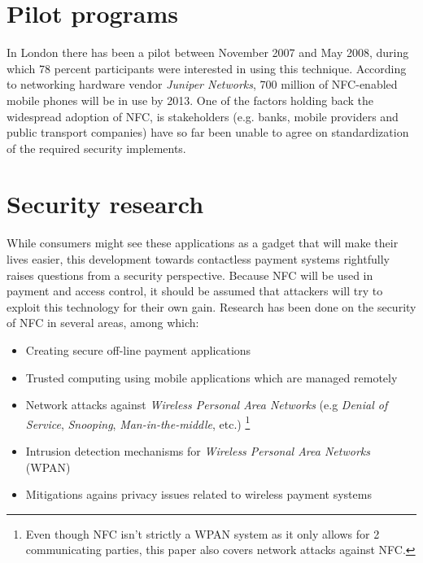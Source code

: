 \section{Pilot programs}
In London there has been a pilot between November 2007 and May 2008, during which 78 percent participants were interested in using this technique.
According to networking hardware vendor \textit{Juniper Networks}, 700 million of NFC-enabled mobile phones will be in use by 2013. 
One of the factors holding back the widespread adoption of NFC, is stakeholders (e.g. banks, mobile providers and public transport companies) have so far been unable to agree on standardization of the required security implements. 

\section{Security research}
While consumers might see these applications as a gadget that will make their lives easier, this development towards contactless payment systems rightfully raises questions from a security perspective.
Because NFC will be used in payment and access control, it should be assumed that attackers will try to exploit this technology for their own gain. 
Research has been done on the security of NFC in several areas, among which:

\begin{itemize}
\item Creating secure off-line payment applications
\item Trusted computing using mobile applications which are managed remotely
\item Network attacks against \textit{Wireless Personal Area Networks} (e.g \textit{Denial of Service}, \textit{Snooping}, \textit{Man-in-the-middle}, etc.) \footnote{Even though NFC isn't strictly a WPAN system as it only allows for 2 communicating parties, this paper also covers network attacks against NFC.} %
\item Intrusion detection mechanisms for \textit{Wireless Personal Area Networks} (WPAN)
\item Mitigations agains privacy issues related to wireless payment systems
\end{itemize}

